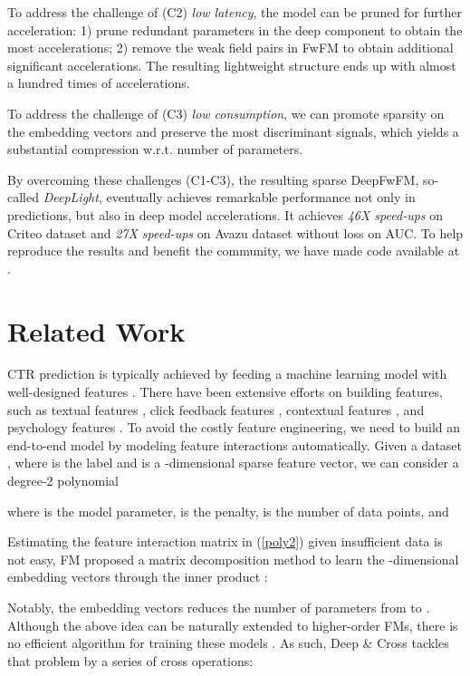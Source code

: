 \documentclass[sigconf]{acmart}
\begin{document}
 To address the challenge of (C2) \emph{low latency}, the model can be pruned for further acceleration: 1) prune redundant parameters in the deep component to obtain the most accelerations; 2) remove the weak field pairs in FwFM to obtain additional significant accelerations. The resulting lightweight structure ends up with almost a hundred times of accelerations.



 To address the challenge of (C3) \emph{low consumption}, we can promote sparsity on the embedding vectors and preserve the most discriminant signals, which yields a substantial compression w.r.t. number of parameters.

By overcoming these challenges (C1-C3), the resulting sparse DeepFwFM, so-called \emph{DeepLight}, eventually achieves remarkable performance not only in predictions, but also in deep
model accelerations. It achieves \emph{46X speed-ups} on Criteo dataset and \emph{27X speed-ups} on
Avazu dataset without loss on AUC. To help reproduce the results and benefit the community, we have made code available at .




 


\section{Related Work}

CTR prediction is typically achieved by feeding a machine learning model with well-designed features \cite{Xinran_He, linear1}. There
have been extensive efforts on building features, such as textual
features \cite{Shaparenko}, click feedback features \cite{Graepel}, contextual features \cite{linear1}, and psychology features \cite{Taifeng}. To avoid the costly feature engineering, we need to build an end-to-end model by modeling feature interactions automatically. Given a dataset , where  is the label and  is a -dimensional sparse feature vector, we can consider a degree-2 polynomial 

where  is the model parameter,  is the  penalty,  is the number of data points, and 


Estimating the feature interaction matrix  in (\ref{poly2}) given insufficient data is not easy, FM \cite{FM} proposed a matrix decomposition method to learn the -dimensional embedding vectors  through the inner product :


Notably, the embedding vectors  reduces the number of parameters from  to . Although the above idea can be naturally extended to higher-order FMs, there is no efficient algorithm for training these models \citep{NIPS2016_6144}. As such, Deep \& Cross \citep{deepcross} tackles that problem by a series of cross operations:
\end{document}
